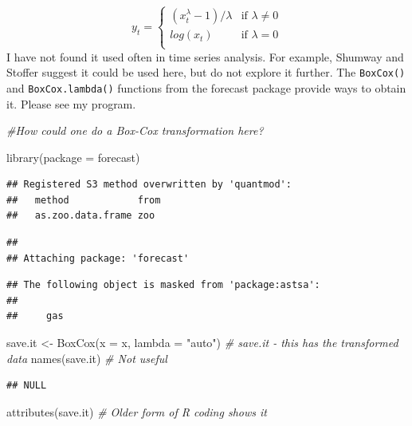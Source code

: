 \documentclass[
]{book}
\newenvironment{Shaded}{\begin{snugshade}}{\end{snugshade}}
\newcommand{\AttributeTok}[1]{\textcolor[rgb]{0.77,0.63,0.00}{#1}}
\newcommand{\CommentTok}[1]{\textcolor[rgb]{0.56,0.35,0.01}{\textit{#1}}}
\newcommand{\FunctionTok}[1]{\textcolor[rgb]{0.00,0.00,0.00}{#1}}
\newcommand{\NormalTok}[1]{#1}
\newcommand{\OtherTok}[1]{\textcolor[rgb]{0.56,0.35,0.01}{#1}}
\newcommand{\StringTok}[1]{\textcolor[rgb]{0.31,0.60,0.02}{#1}}
\theoremstyle{definition}
\theoremstyle{definition}
\theoremstyle{definition}
\theoremstyle{definition}
\theoremstyle{remark}
\begin{document}
\[
y_t= 
\begin{cases}
(x^{\lambda}_t-1)/\lambda & \text{if } \lambda \ne 0 \\
log(x_t) &  \text{if } \lambda=0  \\
\end{cases}
\]
I have not found it used often in time series analysis. For example, Shumway and Stoffer suggest it could be used here, but do not explore it further. The \texttt{BoxCox()} and \texttt{BoxCox.lambda()} functions from the forecast package provide ways to obtain it. Please see my program.

\begin{Shaded}
\begin{Highlighting}[]
\CommentTok{\#How could one do a Box{-}Cox transformation here?}

\FunctionTok{library}\NormalTok{(}\AttributeTok{package =}\NormalTok{ forecast)}
\end{Highlighting}
\end{Shaded}

\begin{verbatim}
## Registered S3 method overwritten by 'quantmod':
##   method            from
##   as.zoo.data.frame zoo
\end{verbatim}

\begin{verbatim}
## 
## Attaching package: 'forecast'
\end{verbatim}

\begin{verbatim}
## The following object is masked from 'package:astsa':
## 
##     gas
\end{verbatim}

\begin{Shaded}
\begin{Highlighting}[]
\NormalTok{save.it }\OtherTok{\textless{}{-}} \FunctionTok{BoxCox}\NormalTok{(}\AttributeTok{x =}\NormalTok{ x, }\AttributeTok{lambda =} \StringTok{"auto"}\NormalTok{)}
\CommentTok{\# save.it {-} this has the transformed data}
\FunctionTok{names}\NormalTok{(save.it) }\CommentTok{\# Not useful}
\end{Highlighting}
\end{Shaded}

\begin{verbatim}
## NULL
\end{verbatim}

\begin{Shaded}
\begin{Highlighting}[]
\FunctionTok{attributes}\NormalTok{(save.it)  }\CommentTok{\# Older form of R coding shows it}
\end{Highlighting}
\end{Shaded}
\end{document}
